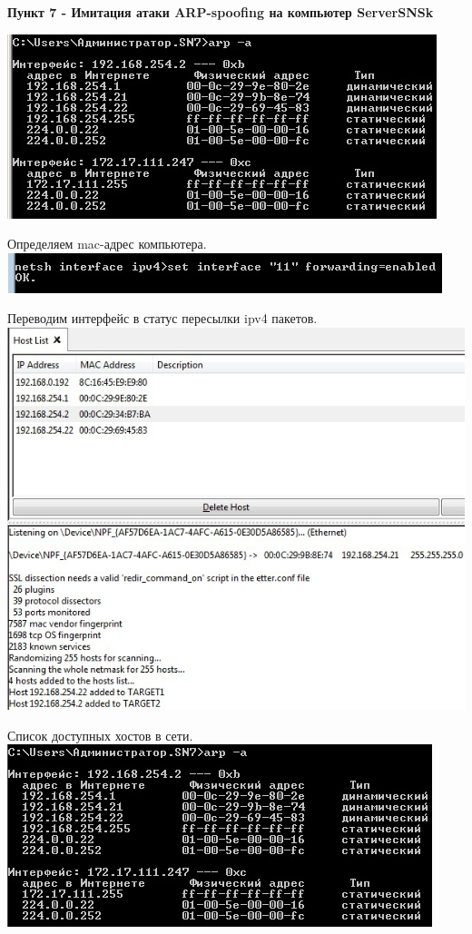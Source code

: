 \documentclass[a4paper,14pt]{extarticle}
\begin{document}
    \textbf{Пункт 7 - Имитация атаки ARP-spoofing на компьютер ServerSNSk}
    \begin{center}
        \includegraphics[scale=0.8]{pics/7_1.jpg}
        
        Определяем mac-адрес компьютера.
        \includegraphics[scale=0.8]{pics/7_2.jpg}

        Переводим интерфейс в статус пересылки ipv4 пакетов.
        \includegraphics[scale=0.64]{pics/7_3.jpg}

        Список доступных хостов в сети.
        \includegraphics[scale=0.8]{pics/7_4.jpg}


\end{center}
\end{document}
